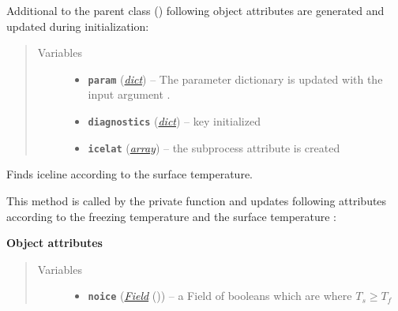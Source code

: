 \documentclass[a4paper,10pt,english]{sphinxmanual}
\begin{document}
\begin{fulllineitems}
Additional to the parent class 
{\hyperref[api/climlab.process:climlab.process.diagnostic.DiagnosticProcess]{\emph{}}} ()
following object attributes are generated and updated during initialization:
\begin{quote}\begin{description}
\item[{Variables}] \leavevmode\begin{itemize}
\item {} 
\textbf{\texttt{param}} (\href{http://docs.python.org/2.7/library/stdtypes.html\#dict}{\emph{dict}}) -- The parameter dictionary is updated with the 
input argument .

\item {} 
\textbf{\texttt{diagnostics}} (\href{http://docs.python.org/2.7/library/stdtypes.html\#dict}{\emph{dict}}) -- key  initialized

\item {} 
\textbf{\texttt{icelat}} (\href{http://docs.python.org/2.7/library/array.html\#module-array}{\emph{array}}) -- the subprocess attribute  is
created

\end{itemize}

\end{description}\end{quote}

\begin{fulllineitems}
\label{api/climlab.surface:climlab.surface.albedo.Iceline.find_icelines}
Finds iceline according to the surface temperature.

This method is called by the private function 
and updates following attributes according to the freezing temperature
 and the surface temperature :

\textbf{Object attributes}
\begin{quote}\begin{description}
\item[{Variables}] \leavevmode\begin{itemize}
\item {} 
\textbf{\texttt{noice}} ({\hyperref[api/climlab.domain:climlab.domain.field.Field]{\emph{\emph{Field}}}} ()) -- a Field of booleans which are  where
\(T_s \ge T_f\)


\end{itemize}
\end{description}
\end{quote}
\end{fulllineitems}
\end{fulllineitems}
\end{document}
